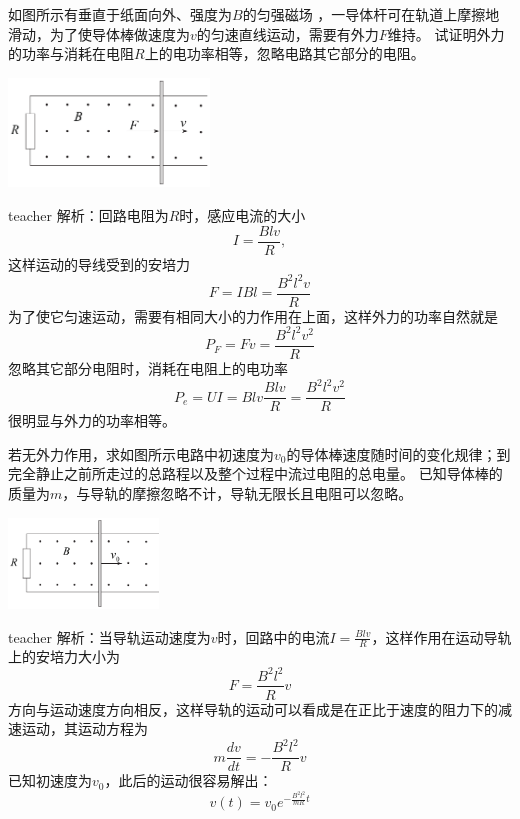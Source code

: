 \begin{example}
如图所示有垂直于纸面向外、强度为$B$的匀强磁场 ，一导体杆可在轨道上摩擦地滑动，为了使导体棒做速度为$v$的匀速直线运动，需要有外力$F$维持。
试证明外力的功率与消耗在电阻$R$上的电功率相等，忽略电路其它部分的电阻。
\begin{flushright}
\includegraphics[width = 0.4\textwidth]{images/mag-14.pdf} 
\end{flushright}
\begin{taggedblock}{teacher}
\noindent
解析：回路电阻为$R$时，感应电流的大小
\[I = \frac{Blv}{R},\]
这样运动的导线受到的安培力
\[F = IBl = \frac{B^2l^2v}{R}\]
为了使它匀速运动，需要有相同大小的力作用在上面，这样外力的功率自然就是
\[P_F=Fv=\frac{B^2l^2v^2}{R}\]
忽略其它部分电阻时，消耗在电阻上的电功率
\[P_e = UI =Blv \frac{Blv}{R}=\frac{B^2l^2v^2}{R}\]
很明显与外力的功率相等。
\end{taggedblock}
\end{example}




\begin{example}
若无外力作用，求如图所示电路中初速度为$v_0$的导体棒速度随时间的变化规律；到完全静止之前所走过的总路程以及整个过程中流过电阻的总电量。
已知导体棒的质量为$m$，与导轨的摩擦忽略不计，导轨无限长且电阻可以忽略。
\begin{flushright}
\includegraphics[width = 0.3\textwidth]{images/mag-15.pdf} 
\end{flushright}
\begin{taggedblock}{teacher}
\noindent
解析：当导轨运动速度为$v$时，回路中的电流$I=\frac{Blv}{R}$，这样作用在运动导轨上的安培力大小为
\[F = \frac{B^2l^2}{R}v\]
方向与运动速度方向相反，这样导轨的运动可以看成是在正比于速度的阻力下的减速运动，其运动方程为
\[
m\frac{dv}{dt}=-\frac{B^2l^2}{R}v
\]
已知初速度为$v_0$，此后的运动很容易解出：
\[
v(t)=v_0e^{-\frac{B^2l^2}{mR}t}
\]
\end{taggedblock}
\end{example}




